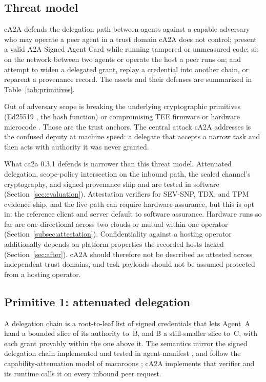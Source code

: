 \subsection{Threat model}

cA2A defends the delegation path between agents against a capable adversary who may operate a
peer agent in a trust domain cA2A does not control; present a valid A2A Signed Agent Card
while running tampered or unmeasured code; sit on the network between two agents or operate
the host a peer runs on; and attempt to widen a delegated grant, replay a credential into
another chain, or reparent a provenance record. The assets and their defenses are summarized
in Table~\ref{tab:primitives}.

Out of adversary scope is breaking the underlying cryptographic primitives (Ed25519
\citep{eddsa2017}, the hash function) or compromising TEE firmware or hardware microcode
\citep{amdsevsnp2023,inteltdx2023}. Those are the trust anchors. The central attack cA2A
addresses is the confused deputy \citep{confuseddeputy1988} at machine speed: a delegate that
accepts a narrow task and then acts with authority it was never granted.

What ca2a 0.3.1 defends is narrower than this threat model. Attenuated delegation,
scope-policy intersection on the inbound path, the sealed channel's cryptography, and signed
provenance ship and are tested in software (Section~\ref{sec:evaluation}). Attestation
verifiers for SEV-SNP, TDX, and TPM evidence ship, and the live path can require hardware
assurance, but this is opt in: the reference client and server default to software assurance.
Hardware runs so far are one-directional across two clouds or mutual within one operator
(Section~\ref{subsec:attestation}). Confidentiality against a hosting operator additionally
depends on platform properties the recorded hosts lacked (Section~\ref{sec:after}). cA2A
should therefore not be described as attested across independent trust domains, and task
payloads should not be assumed protected from a hosting operator.

\subsection{Primitive 1: attenuated delegation}\label{subsec:delegation}

A delegation chain is a root-to-leaf list of signed credentials that lets Agent~A hand a
bounded slice of its authority to~B, and B a still-smaller slice to~C, with each grant
provably within the one above it. The semantics mirror the signed delegation chain
implemented and tested in agent-manifest \citep{agentmanifest2026}, and follow the
capability-attenuation model of macaroons \citep{macaroons2014}; cA2A implements that verifier
and its runtime calls it on every inbound peer request.

